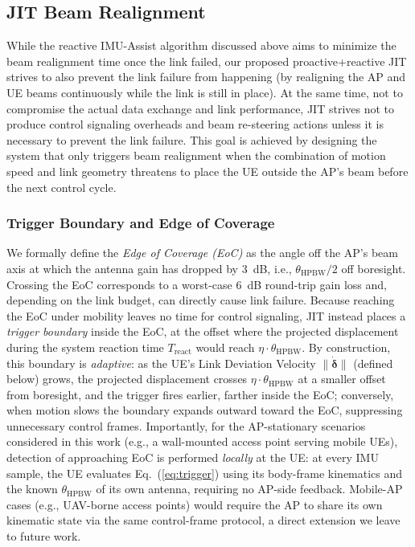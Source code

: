 \documentclass[fleqn,10pt]{wlscirep}
\newcommand{\rev}[1]{{\color{revblue}#1}}
\begin{document}
\subsection*{JIT Beam Realignment}
While the reactive IMU-Assist algorithm discussed above aims to minimize the beam realignment time once the link failed, our proposed proactive+reactive JIT strives to also prevent the link failure from happening (by realigning the AP and UE beams continuously while the link is still in place). At the same time, not to compromise the actual data exchange and link performance, JIT strives not to produce control signaling overheads and beam re-steering actions unless it is necessary to prevent the link failure. This goal is achieved by designing the system that only triggers beam realignment when the combination of motion speed and link geometry threatens to place the UE outside the AP's beam before the next control cycle.

\rev{\subsubsection*{Trigger Boundary and Edge of Coverage}
We formally define the \emph{Edge of Coverage (EoC)} as the angle off the AP's beam axis at which the antenna gain has dropped by \SI{3}{\deci\bel}, i.e., $\theta_{\text{HPBW}}/2$ off boresight. Crossing the EoC corresponds to a worst-case \SI{6}{\deci\bel} round-trip gain loss and, depending on the link budget, can directly cause link failure. Because reaching the EoC under mobility leaves no time for control signaling, JIT instead places a \emph{trigger boundary} inside the EoC, at the offset where the projected displacement during the system reaction time $T_{\text{react}}$ would reach $\eta \cdot \theta_{\text{HPBW}}$. By construction, this boundary is \emph{adaptive}: as the UE's Link Deviation Velocity $\|\dot{\boldsymbol{\delta}}\|$ (defined below) grows, the projected displacement crosses $\eta \cdot \theta_{\text{HPBW}}$ at a smaller offset from boresight, and the trigger fires earlier, farther inside the EoC; conversely, when motion slows the boundary expands outward toward the EoC, suppressing unnecessary control frames. Importantly, for the AP-stationary scenarios considered in this work (e.g., a wall-mounted access point serving mobile UEs), detection of approaching EoC is performed \emph{locally} at the UE: at every IMU sample, the UE evaluates Eq.~(\ref{eq:trigger}) using its body-frame kinematics and the known $\theta_{\text{HPBW}}$ of its own antenna, requiring no AP-side feedback. Mobile-AP cases (e.g., UAV-borne access points) would require the AP to share its own kinematic state via the same control-frame protocol, a direct extension we leave to future work.}
\end{document}

